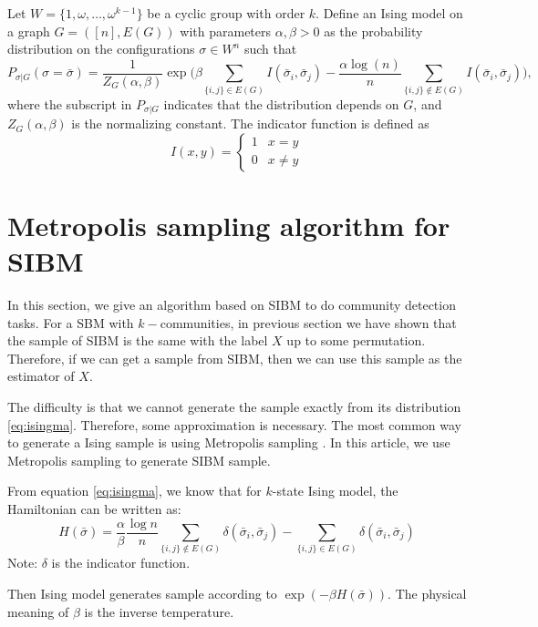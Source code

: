 \documentclass{ctexart}
\begin{document}
	Let $W=\{1, \omega, \dots, \omega^{k-1}\}$ be a cyclic group with order $k$.
	Define an Ising model on a graph $G=([n],E(G))$ with parameters $\alpha,\beta>0$
	as the probability distribution on the configurations $\sigma\in W^n$ such that
	\begin{equation} \label{eq:isingma}
	P_{\sigma|G}(\sigma=\bar{\sigma})=\frac{1}{Z_G(\alpha,\beta)}
	\exp\Big(\beta\sum_{\{i,j\}\in E(G)} I(\bar{\sigma}_i ,\bar{\sigma}_j)
	-\frac{\alpha\log(n)}{n} \sum_{\{i,j\}\notin E(G)} I(\bar{\sigma}_i, \bar{\sigma}_j)\Big) ,
	\end{equation}
	where the subscript in $P_{\sigma|G}$ indicates that the distribution depends on $G$, and 
	$Z_G(\alpha,\beta)$
	is the normalizing constant. The indicator function is defined as
	$$
	I(x ,y) = \begin{cases}
	1 & x = y\\
	0 & x \neq y
	\end{cases}
	$$
	
	\section{Metropolis sampling algorithm for SIBM}
	In this section, we give an algorithm based on SIBM to do community detection tasks.
	For a SBM with $k-$communities, in previous section we have shown that the sample of SIBM is the same with the label $X$ up to some permutation. 
	Therefore, if we can get a sample from SIBM, then we can use this sample as the estimator of $X$.
	
	The difficulty is that we cannot generate the sample exactly from its distribution \eqref{eq:isingma}. Therefore, some approximation is
	necessary. The most common way to generate a Ising sample is using Metropolis sampling \cite{metropolis1953equation}.
	In this article, we use Metropolis sampling to generate SIBM sample.
	
	From equation \eqref{eq:isingma}, we know that for $k$-state Ising model, the Hamiltonian can be written as:
	\begin{equation}
	H(\bar{\sigma}) = \frac{\alpha}{\beta} \frac{\log n}{n} \sum_{\{i,j\}\not\in E(G)} \delta(\bar{\sigma}_i, \bar{\sigma}_j)
		- \sum_{\{i,j\}\in E(G)} \delta(\bar{\sigma}_i, \bar{\sigma}_j)
	\end{equation}
	Note: $\delta$ is the indicator function.
	
	Then Ising model generates sample according to $\exp(-\beta H(\bar{\sigma}))$. The physical meaning of $\beta$ is the inverse temperature.
	
\end{document}
